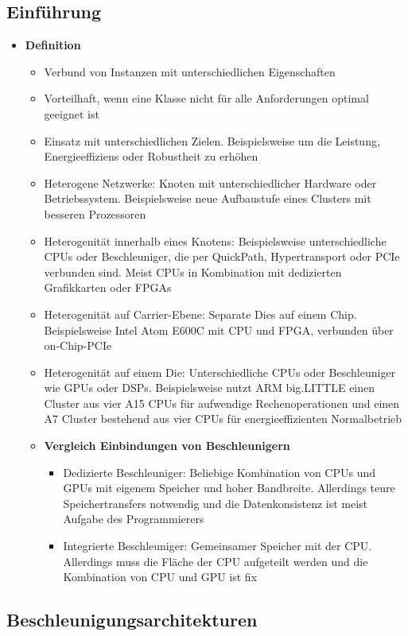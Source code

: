\subsection{Einführung}
\begin{itemize}
	\item \textbf{Definition}
	\begin{itemize}
		\item Verbund von Instanzen mit unterschiedlichen Eigenschaften
		\item Vorteilhaft, wenn eine Klasse nicht für alle Anforderungen optimal geeignet ist
		\item Einsatz mit unterschiedlichen Zielen. Beispielsweise um die Leistung, Energieeffiziens oder Robustheit zu erhöhen
		\item Heterogene Netzwerke: Knoten mit unterschiedlicher Hardware oder Betriebssystem. Beispielsweise neue Aufbaustufe eines Clusters mit besseren Prozessoren
		\item Heterogenität innerhalb eines Knotens: Beispielsweise unterschiedliche CPUs oder Beschleuniger, die per QuickPath, Hypertransport oder PCIe verbunden sind. Meist CPUs in Kombination mit dedizierten Grafikkarten oder FPGAs
		\item Heterogenität auf Carrier-Ebene: Separate Dies auf einem Chip. Beispielsweise Intel Atom E600C mit CPU und FPGA, verbunden über on-Chip-PCIe
		\item Heterogenität auf einem Die: Unterschiedliche CPUs oder Beschleuniger wie GPUs oder DSPs. Beispielsweise nutzt ARM big.LITTLE einen Cluster aus vier A15 CPUs für aufwendige Rechenoperationen und einen A7 Cluster bestehend aus vier CPUs für energieeffizienten Normalbetrieb
		\item \textbf{Vergleich Einbindungen von Beschleunigern}
		\begin{itemize}
			\item Dedizierte Beschleuniger: Beliebige Kombination von CPUs und GPUs mit eigenem Speicher und hoher Bandbreite. Allerdings teure Speichertransfers notwendig und die Datenkonsistenz ist meist Aufgabe des Programmierers
			\item Integrierte Beschleuniger: Gemeinsamer Speicher mit der CPU. Allerdings muss die Fläche der CPU aufgeteilt werden und die Kombination von CPU und GPU ist fix
		\end{itemize}
	\end{itemize}
\end{itemize}


\subsection{Beschleunigungsarchitekturen}

